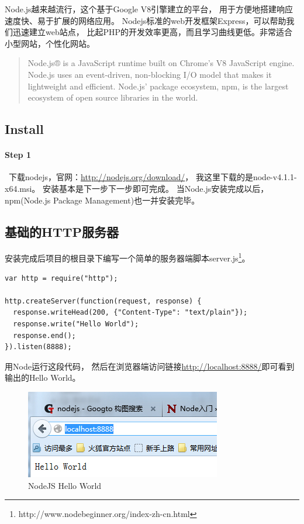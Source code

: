 \documentclass{book}
\begin{document}
Node.js越来越流行，这个基于Google V8引擎建立的平台， 
用于方便地搭建响应速度快、易于扩展的网络应用。
Nodejs标准的web开发框架Express，可以帮助我们迅速建立web站点，
比起PHP的开发效率更高，而且学习曲线更低。非常适合小型网站，个性化网站。

\begin{quotation}
Node.js® is a JavaScript runtime built on Chrome's V8 JavaScript engine. 
Node.js uses an event-driven, non-blocking I/O model that makes it lightweight and efficient. 
Node.js' package ecosystem, npm, is the largest ecosystem of open source libraries in the world.
\end{quotation}

\subsection{Install}

\paragraph{Step 1}~下载nodejs，官网：\url{http://nodejs.org/download/}，
我这里下载的是node-v4.1.1-x64.msi。
安装基本是下一步下一步即可完成。
当Node.js安装完成以后，npm(Node.js Package Management)也一并安装完毕。


\subsection{基础的HTTP服务器}

安装完成后项目的根目录下编写一个简单的服务器端脚本server.js\footnote{http://www.nodebeginner.org/index-zh-cn.html}。

\begin{lstlisting}[language=VBScript]
var http = require("http");

http.createServer(function(request, response) {
  response.writeHead(200, {"Content-Type": "text/plain"});
  response.write("Hello World");
  response.end();
}).listen(8888);
\end{lstlisting}

用Node运行这段代码，
然后在浏览器端访问链接\url{http://localhost:8888/}即可看到输出的Hello World。

\begin{figure}[htbp]
	\centering
	\includegraphics[scale=1]{NodeJSFirstHelloWorld.jpg}
	\caption{NodeJS Hello World}
	\label{fig:NodeJSFirstHelloWorld}
\end{figure}
\end{document}
